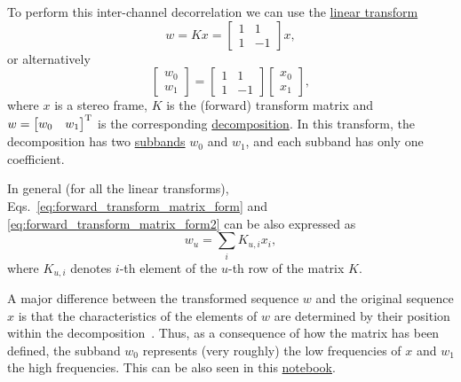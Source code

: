 To perform this inter-channel decorrelation we can use the \href{https://en.wikipedia.org/wiki/Linear_map}{linear transform}
\begin{equation}
  w = Kx = \begin{bmatrix} 1 & 1 \\ 1 & -1 \end{bmatrix}x,
  \label{eq:forward_transform_matrix_form}
\end{equation}
or alternatively
\begin{equation}
  \begin{bmatrix}
    w_0 \\
    w_1
  \end{bmatrix}
  = 
  \begin{bmatrix} 1 & 1 \\ 1 & -1 \end{bmatrix}
  \begin{bmatrix}
    x_0 \\
    x_1
  \end{bmatrix},
  \label{eq:forward_transform_matrix_form2}
\end{equation}
where $x$ is a stereo frame, $K$ is the (forward) transform matrix and
$w=\begin{bmatrix} w_0 &
w_1\end{bmatrix}^{\text T}$ is the corresponding
\href{https://en.wikipedia.org/wiki/Discrete_wavelet_transform#Example_in_image_processing}{decomposition}. In
this transform, the decomposition has two
\href{https://en.wikipedia.org/wiki/Sub-band_coding}{subbands} $w_0$
and $w_1$, and each subband has only one coefficient.


In general (for all the linear transforms),
Eqs.~\ref{eq:forward_transform_matrix_form} and
\ref{eq:forward_transform_matrix_form2} can be also expressed as
\begin{equation}
  w_u = \sum_i K_{u,i}x_i,
  \label{eq:forward_transform_linear_combination_form}
\end{equation}
where $K_{u,i}$ denotes $i$-th element of the $u$-th row of the matrix
$K$.

A major difference between the transformed sequence $w$ and the
original sequence $x$ is that the characteristics of the elements of
$w$ are determined by their position within the
decomposition~\cite{sayood2017introduction}. Thus, as a consequence of
how the matrix has been defined, the subband $w_0$ represents (very
roughly) the low frequencies of $x$ and $w_1$ the high
frequencies. This can be also seen in this \href{}{notebook}.

